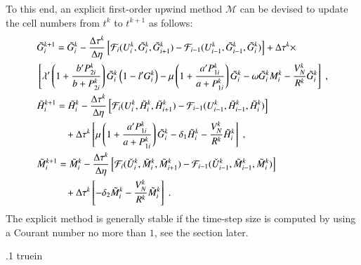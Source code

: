 \documentclass{amsart}
\theoremstyle{definition}
\theoremstyle{remark}
\numberwithin{equation}{section}
\numberwithin{figure}{section}
\begin{document}
To this end, an explicit first-order upwind method $\mathcal{M}$ can be devised to update the cell numbers from $t^k$ to $t^{k+1}$ as follows:
\begin{subequations}\label{eq:num_ex_upw_cell}
\begin{align}
\label{eq:num_ex_upw_cell_g}
&\tilde{G}_i^{k+1} = \tilde{G}_i^k - \frac{\Delta\tau^k}{\Delta\eta}\left[\mathcal{F}_i(U_i^k,\tilde{G}_i^k,\tilde{G}_{i+1}^k)-\mathcal{F}_{i-1}(U_{i-1}^k,\tilde{G}_{i-1}^k,\tilde{G}_i^k)\right] + \Delta\tau^k\times \\
\notag
    & \left[\lambda'\left(1+\frac{b'P_{2i}^k}{b+P_{2i}^k}\right)\tilde{G}_i^k\left(1-l'G_i^k\right)-\mu\left(1+\frac{a'P_{1i}^k}{a+P_{1i}^k}\right)\tilde{G}_i^k-\omega\tilde{G}_i^kM_i^k-\frac{V_N^k}{R^k}\tilde{G}_i^k\right]\;, \\
\label{eq:num_ex_upw_cell_h}
&\tilde{H}_i^{k+1} = \tilde{H}_i^k - \frac{\Delta\tau^k}{\Delta\eta}\left[\mathcal{F}_i(U_i^k,\tilde{H}_i^k,\tilde{H}_{i+1}^k)-\mathcal{F}_{i-1}(U_{i-1}^k,\tilde{H}_{i-1}^k,\tilde{H}_i^k)\right] \\
\notag
& \hspace*{.4in} + \Delta\tau^k\left[\mu\left(1+\frac{a'P_{1i}^k}{a+P_{1i}^k}\right)\tilde{G}_i^k-\delta_1\tilde{H}_i^k-\frac{V_N^k}{R^k}\tilde{H}_i^k\right]\;, \\
\label{eq:num_ex_upw_cell_n}
&\tilde{M}_i^{k+1} = \tilde{M}_i^k - \frac{\Delta\tau^k}{\Delta\eta}\left[\mathcal{F}_i(\check{U}_i^k,\tilde{M}_i^k,\tilde{M}_{i+1}^k)-\mathcal{F}_{i-1}(\check{U}_{i-1}^k,\tilde{M}_{i-1}^k,\tilde{M}_i^k)\right] \\
\notag
& \hspace*{.4in} + \Delta\tau^k\left[-\delta_2\tilde{M}_i^k-\frac{V_N^k}{R^k}\tilde{M}_i^k\right]\;.
\end{align}
\end{subequations}
The explicit method is generally stable if the time-step size is computed by using a Courant number no more than $1$, see the section later.

\vglue .1 truein
\end{document}
